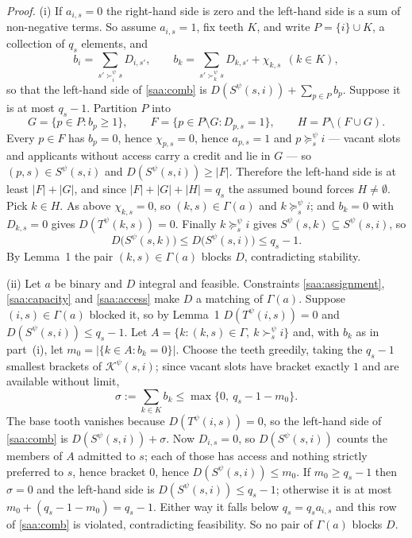 \documentclass{article}
\begin{document}
\textit{Proof.} (i) If $a_{i,s} = 0$ the right-hand side is zero and the left-hand side is a sum of non-negative terms. So assume $a_{i,s} = 1$, fix teeth $K$, and write $P = \{i\} \cup K$, a collection of $q_s$ elements, and
$$b_i = \sum_{s' \succ_i^\psi s} D_{i,s'},
\qquad
b_k = \sum_{s' \succ_k^\psi s} D_{k,s'} + \chi_{k,s} \ \ (k \in K),$$
so that the left-hand side of \eqref{saa:comb} is $D(S^\psi(s,i)) + \sum_{p \in P} b_p$. Suppose it is at most $q_s - 1$. Partition $P$ into
$$G = \{p \in P : b_p \ge 1\},
\qquad
F = \{p \in P \setminus G : D_{p,s} = 1\},
\qquad
H = P \setminus (F \cup G).$$
Every $p \in F$ has $b_p = 0$, hence $\chi_{p,s} = 0$, hence $a_{p,s} = 1$ and $p \succeq_s^\psi i$ --- vacant slots and applicants without access carry a credit and lie in $G$ --- so $(p,s) \in S^\psi(s,i)$ and $D(S^\psi(s,i)) \ge |F|$. Therefore the left-hand side is at least $|F| + |G|$, and since $|F| + |G| + |H| = q_s$ the assumed bound forces $H \neq \emptyset$. Pick $k \in H$. As above $\chi_{k,s} = 0$, so $(k,s) \in \Gamma(a)$ and $k \succeq_s^\psi i$; and $b_k = 0$ with $D_{k,s} = 0$ gives $D(T^\psi(k,s)) = 0$. Finally $k \succeq_s^\psi i$ gives $S^\psi(s,k) \subseteq S^\psi(s,i)$, so
$$D\big(S^\psi(s,k)\big) \le D\big(S^\psi(s,i)\big) \le q_s - 1 .$$
By Lemma~1 the pair $(k,s) \in \Gamma(a)$ blocks $D$, contradicting stability. 

(ii) Let $a$ be binary and $D$ integral and feasible. Constraints \eqref{saa:assignment}, \eqref{saa:capacity} and \eqref{saa:access} make $D$ a matching of $\Gamma(a)$. Suppose $(i,s) \in \Gamma(a)$ blocked it, so by Lemma~1 $D(T^\psi(i,s)) = 0$ and $D(S^\psi(s,i)) \le q_s - 1$. Let $A = \{k : (k,s) \in \Gamma, \ k \succ_s^\psi i\}$ and, with $b_k$ as in part~(i), let $m_0 = |\{k \in A : b_k = 0\}|$. Choose the teeth greedily, taking the $q_s - 1$ smallest brackets of $\mathcal{K}^\psi(s,i)$; since vacant slots have bracket exactly $1$ and are available without limit,
$$\sigma := \sum_{k \in K} b_k \le \max\{0, \ q_s - 1 - m_0\} .$$
The base tooth vanishes because $D(T^\psi(i,s)) = 0$, so the left-hand side of \eqref{saa:comb} is $D(S^\psi(s,i)) + \sigma$. Now $D_{i,s} = 0$, so $D(S^\psi(s,i))$ counts the members of $A$ admitted to $s$; each of those has access and nothing strictly preferred to $s$, hence bracket $0$, hence $D(S^\psi(s,i)) \le m_0$. If $m_0 \ge q_s - 1$ then $\sigma = 0$ and the left-hand side is $D(S^\psi(s,i)) \le q_s - 1$; otherwise it is at most $m_0 + (q_s - 1 - m_0) = q_s - 1$. Either way it falls below $q_s = q_s a_{i,s}$ and this row of \eqref{saa:comb} is violated, contradicting feasibility. So no pair of $\Gamma(a)$ blocks $D$.
\end{document}
